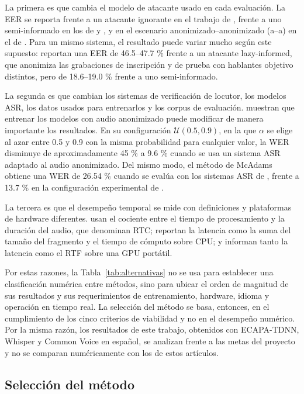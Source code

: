\documentclass[10pt,twocolumn]{article}
\newcommand{\textcite}[1]{\citet{#1}}
\begin{document}
La primera es que cambia el modelo de atacante usado en cada evaluación. La EER se reporta frente a un atacante ignorante en el trabajo de \textcite{deng2023}, frente a uno semi-informado en los de \textcite{patino2021} y \textcite{kuzmin2026}, y en el escenario anonimizado--anonimizado (a--a) en el de \textcite{quamer2024}. Para un mismo sistema, el resultado puede variar mucho según este supuesto: \textcite{kuzmin2026} reportan una EER de 46.5--47.7 \% frente a un atacante lazy-informed, que anonimiza las grabaciones de inscripción y de prueba con hablantes objetivo distintos, pero de 18.6--19.0 \% frente a uno semi-informado.

La segunda es que cambian los sistemas de verificación de locutor, los modelos ASR, los datos usados para entrenarlos y los corpus de evaluación. \textcite{patino2021} muestran que entrenar los modelos con audio anonimizado puede modificar de manera importante los resultados. En su configuración $\mathcal{U}(0.5,0.9)$, en la que $\alpha$ se elige al azar entre 0.5 y 0.9 con la misma probabilidad para cualquier valor, la WER disminuye de aproximadamente 45 \% a 9.6 \% cuando se usa un sistema ASR adaptado al audio anonimizado. Del mismo modo, el método de McAdams obtiene una WER de 26.54 \% cuando se evalúa con los sistemas ASR de \textcite{deng2023}, frente a 13.7 \% en la configuración experimental de \textcite{patino2021}.

La tercera es que el desempeño temporal se mide con definiciones y plataformas de hardware diferentes. \textcite{deng2023} usan el cociente entre el tiempo de procesamiento y la duración del audio, que denominan RTC; \textcite{quamer2024} reportan la latencia como la suma del tamaño del fragmento y el tiempo de cómputo sobre CPU; y \textcite{kuzmin2026} informan tanto la latencia como el RTF sobre una GPU portátil.

Por estas razones, la Tabla~\ref{tab:alternativas} no se usa para establecer una clasificación numérica entre métodos, sino para ubicar el orden de magnitud de sus resultados y sus requerimientos de entrenamiento, hardware, idioma y operación en tiempo real. La selección del método se basa, entonces, en el cumplimiento de los cinco criterios de viabilidad y no en el desempeño numérico. Por la misma razón, los resultados de este trabajo, obtenidos con ECAPA-TDNN, Whisper y Common Voice en español, se analizan frente a las metas del proyecto y no se comparan numéricamente con los de estos artículos.

\subsection{Selección del método}\label{sec:3.4}
\end{document}
